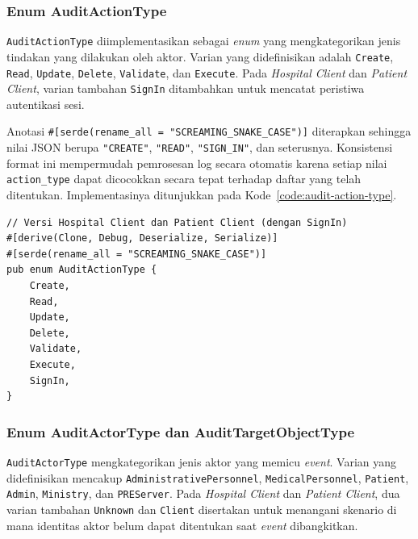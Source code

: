 \subsubsection{Enum AuditActionType}

\texttt{AuditActionType} diimplementasikan sebagai \textit{enum} yang
mengkategorikan jenis tindakan yang dilakukan oleh aktor. Varian yang
didefinisikan adalah \texttt{Create}, \texttt{Read}, \texttt{Update},
\texttt{Delete}, \texttt{Validate}, dan \texttt{Execute}. Pada \textit{Hospital
Client} dan \textit{Patient Client}, varian tambahan \texttt{SignIn} ditambahkan
untuk mencatat peristiwa autentikasi sesi.

Anotasi \texttt{\#[serde(rename\_all = "SCREAMING\_SNAKE\_CASE")]} diterapkan
sehingga nilai JSON berupa \texttt{"CREATE"}, \texttt{"READ"}, \texttt{"SIGN\_IN"},
dan seterusnya. Konsistensi format ini mempermudah pemrosesan log secara
otomatis karena setiap nilai \texttt{action\_type} dapat dicocokkan secara tepat
terhadap daftar yang telah ditentukan. Implementasinya ditunjukkan pada
Kode~\ref{code:audit-action-type}.

\begin{listing}[ht]
\caption{Implementasi \texttt{AuditActionType}}
\label{code:audit-action-type}
\begin{verbatim}
// Versi Hospital Client dan Patient Client (dengan SignIn)
#[derive(Clone, Debug, Deserialize, Serialize)]
#[serde(rename_all = "SCREAMING_SNAKE_CASE")]
pub enum AuditActionType {
    Create,
    Read,
    Update,
    Delete,
    Validate,
    Execute,
    SignIn,
}
\end{verbatim}
\end{listing}

\subsubsection{Enum AuditActorType dan AuditTargetObjectType}

\texttt{AuditActorType} mengkategorikan jenis aktor yang memicu \textit{event}.
Varian yang didefinisikan mencakup \texttt{AdministrativePersonnel},
\texttt{MedicalPersonnel}, \texttt{Patient}, \texttt{Admin}, \texttt{Ministry},
dan \texttt{PREServer}. Pada \textit{Hospital Client} dan \textit{Patient Client},
dua varian tambahan \texttt{Unknown} dan \texttt{Client} disertakan untuk
menangani skenario di mana identitas aktor belum dapat ditentukan saat
\textit{event} dibangkitkan.

